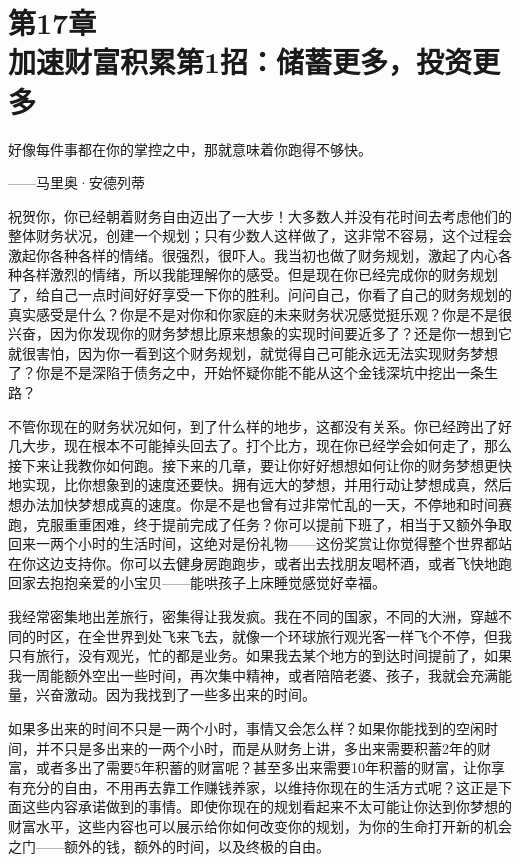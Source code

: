 
\section[第17章\q 加速财富积累第1招：储蓄更多，投资更多]{第17章\\ 加速财富积累第1招：储蓄更多，投资更多}

\begin{BookQuote}
好像每件事都在你的掌控之中，那就意味着你跑得不够快。

\hfill ——马里奥·安德列蒂
\end{BookQuote}

祝贺你，你已经朝着财务自由迈出了一大步！大多数人并没有花时间去考虑他们的整体财务状况，创建一个规划；只有少数人这样做了，这非常不容易，这个过程会激起你各种各样的情绪。很强烈，很吓人。我当初也做了财务规划，激起了内心各种各样激烈的情绪，所以我能理解你的感受。但是现在你已经完成你的财务规划了，给自己一点时间好好享受一下你的胜利。问问自己，你看了自己的财务规划的真实感受是什么？你是不是对你和你家庭的未来财务状况感觉挺乐观？你是不是很兴奋，因为你发现你的财务梦想比原来想象的实现时间要近多了？还是你一想到它就很害怕，因为你一看到这个财务规划，就觉得自己可能永远无法实现财务梦想了？你是不是深陷于债务之中，开始怀疑你能不能从这个金钱深坑中挖出一条生路？

不管你现在的财务状况如何，到了什么样的地步，这都没有关系。你已经跨出了好几大步，现在根本不可能掉头回去了。打个比方，现在你已经学会如何走了，那么接下来让我教你如何跑。接下来的几章，要让你好好想想如何让你的财务梦想更快地实现，比你想象到的速度还要快。拥有远大的梦想，并用行动让梦想成真，然后想办法加快梦想成真的速度。你是不是也曾有过非常忙乱的一天，不停地和时间赛跑，克服重重困难，终于提前完成了任务？你可以提前下班了，相当于又额外争取回来一两个小时的生活时间，这绝对是份礼物——这份奖赏让你觉得整个世界都站在你这边支持你。你可以去健身房跑跑步，或者出去找朋友喝杯酒，或者飞快地跑回家去抱抱亲爱的小宝贝——能哄孩子上床睡觉感觉好幸福。

我经常密集地出差旅行，密集得让我发疯。我在不同的国家，不同的大洲，穿越不同的时区，在全世界到处飞来飞去，就像一个环球旅行观光客一样飞个不停，但我只有旅行，没有观光，忙的都是业务。如果我去某个地方的到达时间提前了，如果我一周能额外空出一些时间，再次集中精神，或者陪陪老婆、孩子，我就会充满能量，兴奋激动。因为我找到了一些多出来的时间。

如果多出来的时间不只是一两个小时，事情又会怎么样？如果你能找到的空闲时间，并不只是多出来的一两个小时，而是从财务上讲，多出来需要积蓄2年的财富，或者多出了需要5年积蓄的财富呢？甚至多出来需要10年积蓄的财富，让你享有充分的自由，不用再去靠工作赚钱养家，以维持你现在的生活方式呢？这正是下面这些内容承诺做到的事情。即使你现在的规划看起来不太可能让你达到你梦想的财富水平，这些内容也可以展示给你如何改变你的规划，为你的生命打开新的机会之门——额外的钱，额外的时间，以及终极的自由。


